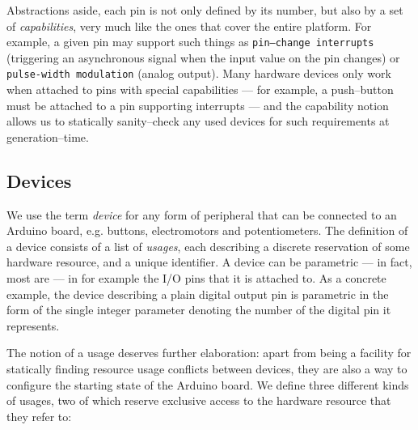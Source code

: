 \documentclass[a4paper, oneside, final]{memoir}
\begin{document}
Abstractions aside, each pin is not only defined by its number, but
also by a set of \textit{capabilities}, very much like the ones that
cover the entire platform.  For example, a given pin may support such
things as \texttt{pin--change interrupts} (triggering an asynchronous
signal when the input value on the pin changes) or \texttt{pulse-width
  modulation} (analog output).  Many hardware devices only work when
attached to pins with special capabilities --- for example, a
push--button must be attached to a pin supporting interrupts --- and
the capability notion allows us to statically sanity--check any used
devices for such requirements at generation--time.

\subsection{Devices}
We use the term \textit{device} for any form of peripheral that can be
connected to an Arduino board, e.g. buttons, electromotors and
potentiometers.  The definition of a device consists of a list of
\textit{usages}, each describing a discrete reservation of some
hardware resource, and a unique identifier.  A device can be
parametric --- in fact, most are --- in for example the I/O pins that
it is attached to.  As a concrete example, the device describing a
plain digital output pin is parametric in the form of the single
integer parameter denoting the number of the digital pin it
represents.

The notion of a usage deserves further elaboration: apart from being a
facility for statically finding resource usage conflicts between
devices, they are also a way to configure the starting state of the
Arduino board.  We define three different kinds of usages, two of which
reserve exclusive access to the hardware resource that they refer to:
\end{document}
